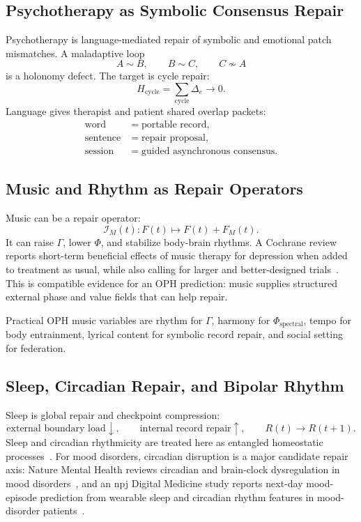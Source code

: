 \documentclass[11pt]{article}
\theoremstyle{remark}
\theoremstyle{plain}
\begin{document}
\subsection{Psychotherapy as Symbolic Consensus Repair}

Psychotherapy is language-mediated repair of symbolic and emotional patch mismatches. A maladaptive loop
\[
A\sim B,\qquad B\sim C,\qquad C\not\sim A
\]
is a holonomy defect. The target is cycle repair:
\[
H_{\mathrm{cycle}}=\sum_{\mathrm{cycle}}\Delta_e\to0.
\]
Language gives therapist and patient shared overlap packets:
\[
\begin{aligned}
\text{word}&=\text{portable record},\\
\text{sentence}&=\text{repair proposal},\\
\text{session}&=\text{guided asynchronous consensus}.
\end{aligned}
\]

\subsection{Music and Rhythm as Repair Operators}

Music can be a repair operator:
\[
\mathcal I_M(t):F(t)\mapsto F(t)+F_M(t).
\]
It can raise \(\Gamma\), lower \(\Phi\), and stabilize body-brain rhythms. A Cochrane review reports short-term beneficial effects of music therapy for depression when added to treatment as usual, while also calling for larger and better-designed trials~\cite{Aalbers2017}. This is compatible evidence for an OPH prediction: music supplies structured external phase and value fields that can help repair.

Practical OPH music variables are rhythm for \(\Gamma\), harmony for \(\Phi_{\mathrm{spectral}}\), tempo for body entrainment, lyrical content for symbolic record repair, and social setting for federation.

\subsection{Sleep, Circadian Repair, and Bipolar Rhythm}

Sleep is global repair and checkpoint compression:
\[
\text{external boundary load}\downarrow,
\qquad
\text{internal record repair}\uparrow,
\qquad
R(t)\to R(t+1).
\]
Sleep and circadian rhythmicity are treated here as entangled homeostatic processes~\cite{FrankenDijk2024}. For mood disorders, circadian disruption is a major candidate repair axis: Nature Mental Health reviews circadian and brain-clock dysregulation in mood disorders~\cite{Mendoza2024}, and an npj Digital Medicine study reports next-day mood-episode prediction from wearable sleep and circadian rhythm features in mood-disorder patients~\cite{Kim2024MoodWearable}.
\end{document}
